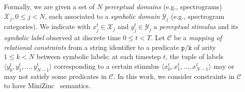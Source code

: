 \fi
%

%
\iffalse
Formally, we are given a set of $N$ \textit{perceptual domains} (e.g., spectrograms) $\mathcal{X}_j, 0 \leq j < N$, each associated to a \textit{symbolic domain} $\mathcal{Y}_j$ (e.g., spectrogram categories).
We indicate with $x_j^{t} \in \mathcal{X}_j$ and $y_j^{t} \in \mathcal{Y}_j$ a \textit{perceptual stimulus} and its \textit{symbolic label} observed at discrete time $0 \leq t < T$.
%
Let $\mathcal{C}$ be a \textit{mapping of relational constraints} from a string identifier to a predicate $\texttt{p/k}$ of arity $1 \leq k < N$ between symbolic labels; at each timestep $t$, the tuple of labels $\langle y^t_0, y^t_1, \dots, y^t_{N-1} \rangle$ corresponding to a certain stimulus $\langle x^t_0, x^t_1, \dots, x^t_{N-1} \rangle$ may or may not satisfy some predicates in $\mathcal{C}$. In this work, we consider constraints in $\mathcal{C}$ to have MiniZinc~\cite{nethercote2007minizinc} semantics.
%

